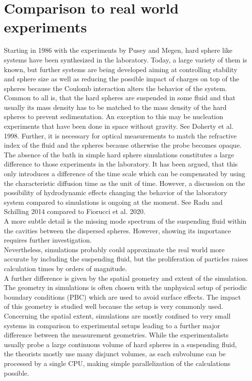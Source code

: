 \section{Comparison to real world experiments} 
\label{sec:comparison}
Starting in 1986 with the experiments by Pusey and Megen\cite{Pusey1986}, hard sphere like systems have been synthesized in the laboratory. Today, a large variety of them is known, but further systems are being developed aiming at controlling stability and sphere size as well as reducing the possible impact of charges on top of the spheres because the Coulomb interaction alters the behavior of the system. Common to all is, that the hard spheres are suspended in some fluid and that usually its mass density has to be matched to the mass density of the hard spheres to prevent sedimentation. An exception to this may be nucleation experiments that have been done in space without gravity. See Doherty et al. 1998\cite{Doherty1998}. Further, it is necessary for optical measurements to match the refractive index of the fluid and the spheres because otherwise the probe becomes opaque.\\

The absence of the bath in simple hard sphere simulations constitutes a large difference to those experiments in the laboratory. It has been argued, that this only introduces a difference of the time scale which can be compensated by using the characteristic diffusion time as the unit of time. However, a discussion on the possibility of hydrodynamic effects changing the behavior of the laboratory system compared to simulations is ongoing at the moment. See Radu and Schilling 2014\cite{Radu2014} compared to Fiorucci et al. 2020\cite{Fiorucci2020a}.\\
A more subtle detail is the missing mode spectrum of the suspending fluid within the cavities between the dispersed spheres. However, showing its importance requires further investigation.\\ 
Nevertheless, simulations probably could approximate the real world more accurate by including the suspending fluid, but the proliferation of particles raises calculation times by orders of magnitude.\\

A further difference is given by the spatial geometry and extent of the simulation. The geometry in simulations is often chosen with the unphysical setup of periodic boundary conditions (PBC) which are used to avoid surface effects. The impact of this geometry is studied well because the setup is very commonly used. \\ 
Concerning the spatial extent, simulations are mostly confined to very small systems in comparison to experimental setups leading to a further major difference between the measurement geometries. While the experimentalists usually probe a large continuous volume of hard spheres in a suspending fluid, the theorists mostly use many disjunct volumes, as each subvolume can be processed by a single CPU, making simple parallelization of the calculations possible.\\

